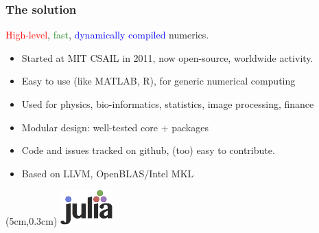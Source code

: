 \documentclass[16pt]{beamer}
\begin{document}
\begin{frame}
  \frametitle{The solution}

  \vspace{.4cm}
  \begin{center}
  \Large{\textcolor{red}{High-level}, \textcolor{ForestGreen}{fast}, \textcolor{blue}{dynamically compiled} numerics.}
  \end{center}

  \begin{itemize}
  \item Started at MIT CSAIL in 2011, now open-source, worldwide activity.
  \item Easy to use (like MATLAB, R), for generic numerical computing
  \item Used for physics, bio-informatics, statistics, image processing, finance
  \item Modular design: well-tested core + packages
  \item Code and issues tracked on github, (too) easy to contribute.
  \item Based on LLVM, OpenBLAS/Intel MKL
  \end{itemize}

  \begin{textblock*}{5cm}(5cm,0.3cm) %
  \includegraphics[width=2cm]{julia.png}
  \end{textblock*}

\end{frame}
\end{document}
